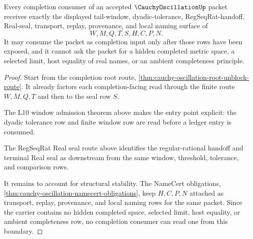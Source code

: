 \begin{theorem}
\label{thm:cauchy-oscillation-completion-consumer-boundary}
Every completion consumer of an accepted $\CauchyOscillationUp$ packet receives exactly the displayed tail-window, dyadic-tolerance, RegSeqRat-handoff, Real-seal, transport, replay, provenance, and local naming surface of
$$
W,M,Q,T,S,H,C,P,N .
$$
It may consume the packet as completion input only after those rows have been exposed, and it cannot ask the packet for a hidden completed metric space, a selected limit, host equality of real names, or an ambient completeness principle.
\end{theorem}
\begin{proof}
Start from the completion root route, \autoref{thm:cauchy-oscillation-root-unblock-route}. It already factors each completion-facing read through the finite route $W,M,Q,T$ and then to the seal row $S$.

The L10 window admission theorem above makes the entry point explicit: the dyadic tolerance row and finite window row are read before a ledger entry is consumed.

The RegSeqRat Real seal route above identifies the regular-rational handoff and terminal Real seal as downstream from the same window, threshold, tolerance, and comparison rows.

It remains to account for structural stability. The NameCert obligations, \autoref{thm:cauchy-oscillation-namecert-obligations}, keep $H,C,P,N$ attached as transport, replay, provenance, and local naming rows for the same packet. Since the carrier contains no hidden completed space, selected limit, host equality, or ambient completeness row, no completion consumer can read one from this boundary.
\end{proof}

